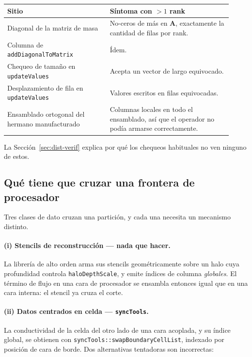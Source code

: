 \documentclass[11pt,a4paper]{article}
\newcommand{\code}[1]{\texttt{\small #1}}
\newcommand{\Aimp}{\mathbf{A}}
\newcommand{\dictkey}[1]{\textcolor{black!60!green}{\texttt{\footnotesize #1}}}
\begin{document}
\begin{center}
\begin{tabular}{@{}p{0.42\linewidth}p{0.50\linewidth}@{}}
\toprule
Sitio & Síntoma con $>1$ rank \\
\midrule
Diagonal de la matriz de masa & No-ceros de más en $\Aimp$, exactamente la
   cantidad de filas por rank. \\
Columna de \code{addDiagonalToMatrix} & Ídem. \\
Chequeo de tamaño en \code{updateValues} & Acepta un vector de largo
   equivocado. \\
Desplazamiento de fila en \code{updateValues} & Valores escritos en filas
   equivocadas. \\
Ensamblado ortogonal del hermano manufacturado & Columnas locales en todo el
   ensamblado, así que el operador no podía armarse correctamente. \\
\bottomrule
\end{tabular}
\end{center}

La Sección~\ref{sec:dist-verif} explica por qué los chequeos habituales no ven
ninguno de estos.

\subsection{Qué tiene que cruzar una frontera de procesador}
\label{sec:dist-exchange}

Tres clases de dato cruzan una partición, y cada una necesita un mecanismo
distinto.

\paragraph{(i) Stencils de reconstrucción --- nada que hacer.}
La librería de alto orden arma sus stencils geométricamente sobre un halo cuya
profundidad controla \dictkey{haloDepthScale}, y emite índices de columna
\emph{globales}. El término de flujo en una cara de procesador se ensambla
entonces igual que en una cara interna: el stencil ya cruza el corte.

\paragraph{(ii) Datos centrados en celda --- \code{syncTools}.}
La conductividad de la celda del otro lado de una cara acoplada, y su índice
global, se obtienen con \code{syncTools::swapBoundaryCellList}, indexado por
posición de cara de borde. Dos alternativas tentadoras son incorrectas:
\end{document}
